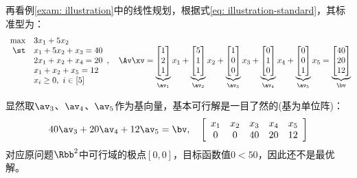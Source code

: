 \documentclass{ctexart}
\begin{document}
\begin{example} \label{exam: simplex}
    再看例\ref{exam: illustration}中的线性规划，根据式\eqref{eq: illustration-standard}，其标准型为：
    \begin{align*}
        \begin{array}{rl}
            \max & 3 x_1 + 5 x_2          \\
            \st  & x_1 + 5 x_2 + x_3 = 40 \\
                 & 2 x_1 + x_2 + x_4 = 20 \\
                 & x_1 + x_2 + x_5 = 12   \\
                 & x_i \ge 0, ~ i \in [5]
        \end{array}, \quad \Av \xv =
        \underbrace{\begin{bmatrix}
                            1 \\ 2 \\ 1
                        \end{bmatrix}}_{\av_1} x_1 +
        \underbrace{\begin{bmatrix}
                            5 \\ 1 \\ 1
                        \end{bmatrix}}_{\av_2} x_2 +
        \underbrace{\begin{bmatrix}
                            1 \\ 0 \\ 0
                        \end{bmatrix}}_{\av_3} x_3 +
        \underbrace{\begin{bmatrix}
                            0 \\ 1 \\ 0
                        \end{bmatrix}}_{\av_4} x_4 +
        \underbrace{\begin{bmatrix}
                            0 \\ 0 \\ 1
                        \end{bmatrix}}_{\av_5} x_5 =
        \underbrace{\begin{bmatrix}
                            40 \\ 20 \\ 12
                        \end{bmatrix}}_{\bv}
    \end{align*}

    显然取$\av_3$、$\av_4$、$\av_5$作为基向量，基本可行解是一目了然的(基为单位阵)：
    \begin{align*}
        40 \av_3 + 20 \av_4 + 12 \av_5 = \bv, \quad
        \left[ \begin{array}{ccccc}
                       x_1 & x_2 & x_3 & x_4 & x_5 \\
                       0   & 0   & 40  & 20  & 12
                   \end{array} \right]
    \end{align*}
    对应原问题$\Rbb^2$中可行域的极点$[0,0]$，目标函数值$0 < 50$，因此还不是最优解。


\end{example}
\end{document}
